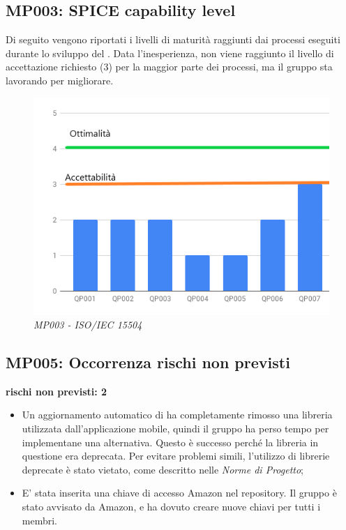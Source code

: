 \subsection{MP003: SPICE capability level}
Di seguito vengono riportati i livelli di maturità raggiunti dai processi eseguiti durante lo sviluppo del . Data l'inesperienza, non viene raggiunto il livello di accettazione richiesto (3) per la maggior parte dei processi, ma il gruppo sta lavorando per migliorare.
\begin{figure} [h]
    \centering
	\includegraphics[scale=0.5]{./images/15504.png}
    \caption{\textit{MP003 - ISO/IEC 15504 }}\label{}
\end{figure}

\subsection{MP005:  Occorrenza rischi non previsti}
\textbf{rischi non previsti: 2}
\begin{itemize}
	\item Un aggiornamento automatico di  ha completamente rimosso una libreria utilizzata dall'applicazione mobile, quindi il gruppo ha perso tempo per implementane una alternativa. Questo è successo perché la libreria in questione era deprecata. Per evitare problemi simili, l'utilizzo di librerie deprecate è stato vietato, come descritto nelle \textit{Norme di Progetto};
	\item E' stata inserita una chiave di accesso Amazon nel repository. Il gruppo è stato avvisato da Amazon, e ha dovuto creare nuove chiavi per tutti i membri.
\end{itemize}

